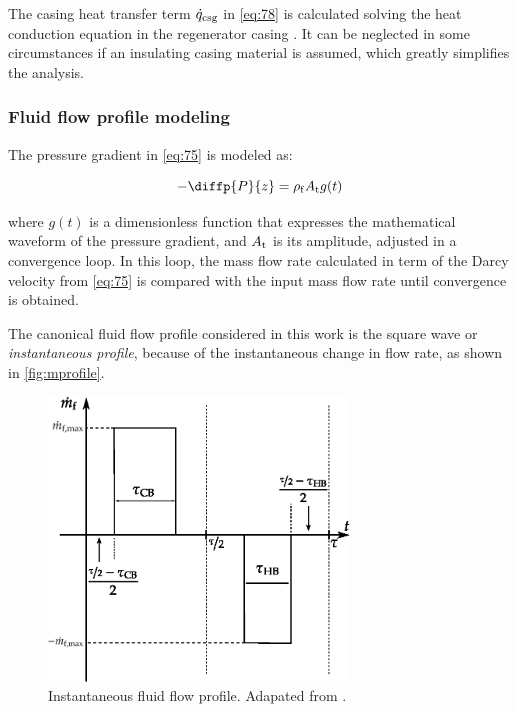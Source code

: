 \documentclass[referee]{svjour3}
\begin{document}
The casing heat transfer term $\dot{q}_{\mathrm{csg}}$ in \autoref{eq:78} is calculated solving the heat conduction equation in the regenerator casing \cite{bib:trevizoli16_perfor_model}. It can be neglected in some circumstances if an insulating casing material is assumed, which greatly simplifies the analysis. 

\subsubsection{Fluid flow profile modeling}
\label{sec:how-fluid-flow}

The pressure gradient in \autoref{eq:75} is modeled as:

\begin{equation}
\label{eq:76}
-\diffp{P}{z} = \rho\ped{f} A\ped{t} g(t)
\end{equation}

\noindent where \(g(t)\) is a dimensionless function that expresses the mathematical waveform of the pressure gradient, and  \(A_{\mathrm{t}}\) is its amplitude,  adjusted in a convergence loop. In this loop, the mass flow rate calculated in term of the Darcy velocity from \autoref{eq:75} is compared with the input   mass flow rate until convergence is obtained. 


The canonical fluid flow profile considered in this work is the square wave or \emph{instantaneous profile}, because of the instantaneous change in flow rate, as shown in \autoref{fig:mprofile}. 

\begin{figure}[!ht]
  \centering
  \includegraphics[width=8cm]{Fig2-mprofile}
  \caption{Instantaneous fluid flow profile. Adapated from \cite{bib:fortkamp20-desig}.}
  \label{fig:mprofile}
\end{figure}
\end{document}
